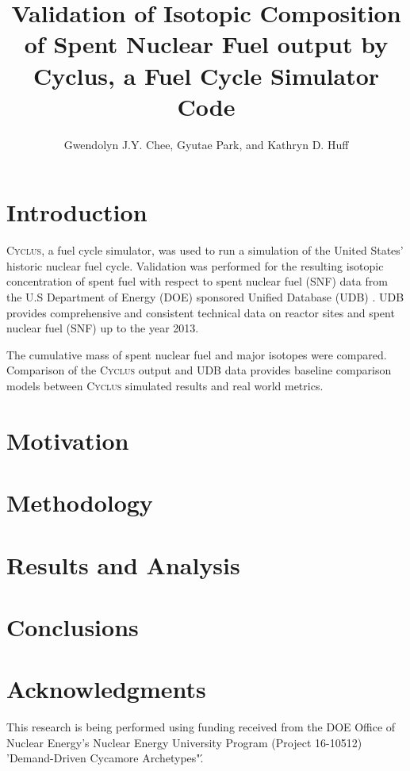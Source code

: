 \documentclass{anstrans}
\title{Validation of Isotopic Composition of Spent Nuclear Fuel output by Cyclus, a Fuel Cycle Simulator Code}
\author{Gwendolyn J.Y. Chee, Gyutae Park, and Kathryn D. Huff}
\institute{
Dept. of Nuclear, Plasma and Radiological Engineering, University of Illinois at Urbana-Champaign \\
gchee2@illinois.edu
}
\newcommand{\Cyclus}{\textsc{Cyclus}\xspace}%
\begin{document}
\section{Introduction}
\Cyclus \cite{huff_fundamentals_2016}, a fuel cycle simulator, was used to run a simulation of the United States' historic nuclear fuel cycle. Validation was performed for the resulting isotopic concentration of spent fuel with respect to spent nuclear fuel (SNF) data from the U.S Department of Energy (DOE) sponsored Unified Database (UDB) \cite{Peterson_UNF_2017}.  UDB provides comprehensive and consistent technical data on reactor sites and spent nuclear fuel (SNF) up to the year 2013.

The cumulative mass of spent nuclear fuel and major isotopes were compared. Comparison of the \Cyclus output and UDB data provides baseline comparison models between \Cyclus simulated results and real world metrics.




\section{Motivation}


\section{Methodology}


\section{Results and Analysis}


\section{Conclusions}

\section{Acknowledgments}
This research is being performed using funding received from the DOE Office of Nuclear Energy's Nuclear Energy University Program (Project 16-10512) 'Demand-Driven Cycamore Archetypes"\'.



\end{document}
